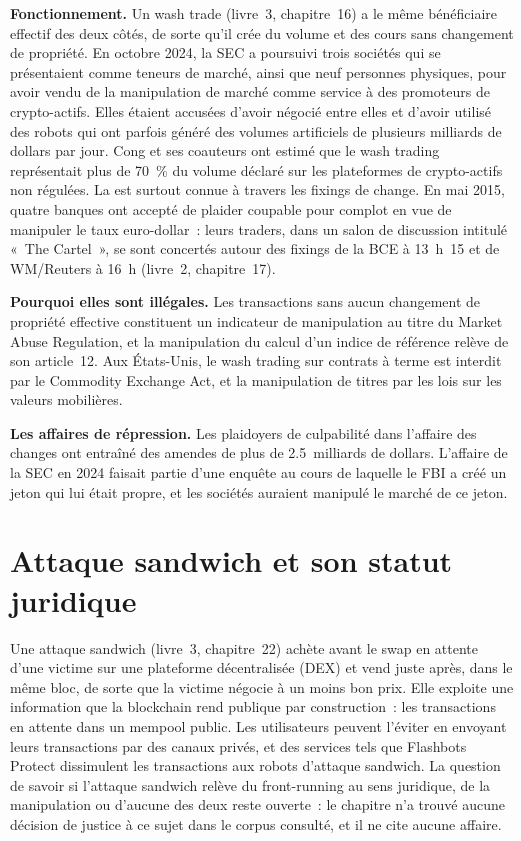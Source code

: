 \textbf{Fonctionnement.} Un wash trade (livre~3, chapitre~16) a le même bénéficiaire effectif des deux côtés, de sorte qu'il crée du volume et des cours sans changement
de propriété. En octobre 2024, la SEC a poursuivi trois sociétés qui se présentaient comme teneurs de marché, ainsi que neuf personnes physiques, pour avoir vendu de la manipulation de marché
comme service à des promoteurs de crypto-actifs. Elles étaient accusées d'avoir négocié entre elles et d'avoir utilisé des robots qui ont parfois généré des volumes artificiels de plusieurs milliards de dollars
par jour. Cong et ses coauteurs ont estimé que le wash trading représentait plus de 70~\% du volume déclaré sur les plateformes de crypto-actifs non régulées. La  est surtout connue à travers les fixings de change. En mai 2015, quatre banques ont accepté de plaider coupable pour complot en vue de manipuler le taux euro-dollar~:
leurs traders, dans un salon de discussion intitulé «~The Cartel~», se sont concertés autour des fixings de la BCE à 13~h~15 et de WM/Reuters à 16~h (livre~2,
chapitre~17).

\textbf{Pourquoi elles sont illégales.} Les transactions sans aucun changement de propriété effective constituent un indicateur de manipulation au titre du Market Abuse Regulation,
et la manipulation du calcul d'un indice de référence relève de son article~12. Aux États-Unis, le wash trading sur contrats à terme est interdit par le
Commodity Exchange Act, et la manipulation de titres par les lois sur les valeurs mobilières.

\textbf{Les affaires de répression.} Les plaidoyers de culpabilité dans l'affaire des changes ont entraîné des amendes de plus de 2.5~milliards de dollars. L'affaire de la SEC en 2024 faisait partie d'une
enquête au cours de laquelle le FBI a créé un jeton qui lui était propre, et les sociétés auraient manipulé le marché de ce jeton.

\section{Attaque sandwich et son statut juridique}

Une attaque sandwich (livre~3, chapitre~22) achète avant le swap en attente d'une victime sur une plateforme décentralisée (DEX) et vend juste après, dans le même bloc,
de sorte que la victime négocie à un moins bon prix. Elle exploite une information que la blockchain rend publique par construction~: les transactions en attente dans un mempool public. Les utilisateurs
peuvent l'éviter en envoyant leurs transactions par des canaux privés, et des services tels que Flashbots Protect dissimulent les transactions aux robots d'attaque sandwich. La
question de savoir si l'attaque sandwich relève du front-running au sens juridique, de la manipulation ou d'aucune des deux reste ouverte~: le chapitre
n'a trouvé aucune décision de justice à ce sujet dans le corpus consulté, et il ne cite aucune affaire.

